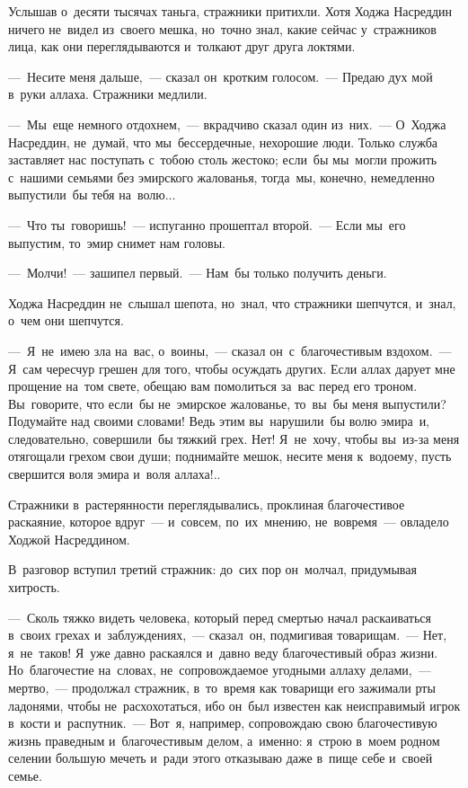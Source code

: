 \documentclass[12pt,a4paper]{book}
\begin{document}
Услышав о~десяти тысячах таньга, стражники притихли. Хотя Ходжа Насреддин ничего не~видел из~своего мешка, но~точно знал, какие сейчас у~стражников лица, как они переглядываются и~толкают друг друга локтями.

—~Несите меня дальше,~— сказал он~кротким голосом.~— Предаю дух мой в~руки аллаха. Стражники медлили.

—~Мы~еще немного отдохнем,~— вкрадчиво сказал один из~них.~— О~Ходжа Насреддин, не~думай, что мы~бессердечные, нехорошие люди. Только служба заставляет нас поступать с~тобою столь жестоко; если~бы мы~могли прожить с~нашими семьями без эмирского жалованья, тогда~мы, конечно, немедленно выпустили~бы тебя на~волю...

—~Что ты~говоришь!~— испуганно прошептал второй.~— Если мы~его выпустим, то~эмир снимет нам головы.

—~Молчи!~— зашипел первый.~— Нам~бы только получить деньги.

Ходжа Насреддин не~слышал шепота, но~знал, что стражники шепчутся, и~знал, о~чем они шепчутся.

—~Я~не~имею зла на~вас, о~воины,~— сказал он~с~благочестивым вздохом.~— Я~сам чересчур грешен для того, чтобы осуждать других. Если аллах дарует мне прощение на~том свете, обещаю вам помолиться за~вас перед его троном. Вы~говорите, что если~бы не~эмирское жалованье, то~вы~бы меня выпустили? Подумайте над своими словами! Ведь этим вы~нарушили~бы волю эмира~и, следовательно, совершили~бы тяжкий грех. Нет! Я~не~хочу, чтобы вы~из-за меня отягощали грехом свои души; поднимайте мешок, несите меня к~водоему, пусть свершится воля эмира и~воля аллаха!..

Стражники в~растерянности переглядывались, проклиная благочестивое раскаяние, которое вдруг~— и~совсем, по~их~мнению, не~вовремя~— овладело Ходжой Насреддином.

В~разговор вступил третий стражник: до~сих пор он~молчал, придумывая хитрость.

—~Сколь тяжко видеть человека, который перед смертью начал раскаиваться в~своих грехах и~заблуждениях,~— сказал~он, подмигивая товарищам.~— Нет, я~не~таков! Я~уже давно раскаялся и~давно веду благочестивый образ жизни. Но~благочестие на~словах, не~сопровождаемое угодными аллаху делами,~— мертво,~— продолжал стражник, в~то~время как товарищи его зажимали рты ладонями, чтобы не~расхохотаться, ибо он~был известен как неисправимый игрок в~кости и~распутник.~— Вот~я, например, сопровождаю свою благочестивую жизнь праведным и~благочестивым делом, а~именно: я~строю в~моем родном селении большую мечеть и~ради этого отказываю даже в~пище себе и~своей семье.
\end{document}
